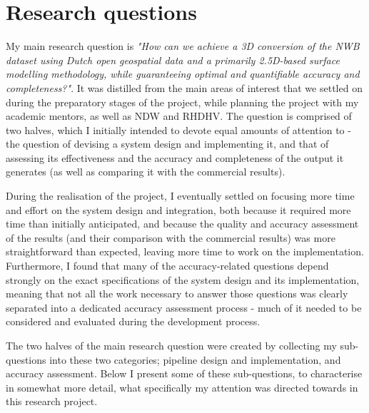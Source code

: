 \section{Research questions}
\label{sec:rq}

My main research question is \textit{"How can we achieve a 3D conversion of the NWB dataset using Dutch open geospatial data and a primarily 2.5D-based surface modelling methodology, while guaranteeing optimal and quantifiable accuracy and completeness?"}. It was distilled from the main areas of interest that we settled on during the preparatory stages of the project, while planning the project with my academic mentors, as well as NDW and RHDHV. The question is comprised of two halves, which I initially intended to devote equal amounts of attention to - the question of devising a system design and implementing it, and that of assessing its effectiveness and the accuracy and completeness of the output it generates (as well as comparing it with the commercial results).

During the realisation of the project, I eventually settled on focusing more time and effort on the system design and integration, both because it required more time than initially anticipated, and because the quality and accuracy assessment of the results (and their comparison with the commercial results) was more straightforward than expected, leaving more time to work on the implementation. Furthermore, I found that many of the accuracy-related questions depend strongly on the exact specifications of the system design and its implementation, meaning that not all the work necessary to answer those questions was clearly separated into a dedicated accuracy assessment process - much of it needed to be considered and evaluated during the development process.

The two halves of the main research question were created by collecting my sub-questions into these two categories; pipeline design and implementation, and accuracy assessment. Below I present some of these sub-questions, to characterise in somewhat more detail, what specifically my attention was directed towards in this research project. 

